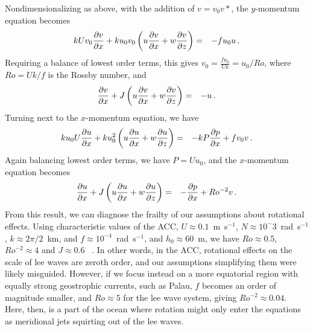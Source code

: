 \documentclass[12pt]{article}
\begin{document}
Nondimensionalizing as above, with the addition of $v = v_0 v*$, the $y$-momentum equation becomes
\begin{eqnarray*}
	kUv_0 \frac{\partial{v}}{\partial{x}} + ku_0v_0\left(u \frac{\partial{v}}{\partial{x}} + w \frac{\partial{v}}{\partial{z}}\right) &=& - fu_0u \,.\\
\end{eqnarray*}
Requiring a balance of lowest order terms, this gives $v_0 = \frac{fu_0}{Uk}=u_0/Ro$, where $Ro = Uk/f$ is the Rossby number, and
\begin{eqnarray*}
	 \frac{\partial{v}}{\partial{x}} + J\left(u \frac{\partial{v}}{\partial{x}} + w \frac{\partial{v}}{\partial{z}}\right) &=& - u \,.\\
\end{eqnarray*}
Turning next to the $x$-momentum equation, we have 
\begin{eqnarray*}
	k u_0 U \frac{\partial{u}}{\partial{x}} + k u_0^2\left( u\frac{\partial{u}}{\partial{x}} + w \frac{\partial{u}}{\partial{z}}\right)  &=& -k P \frac{\partial{p}}{\partial{x}} + fv_0v\,.
\end{eqnarray*}
Again balancing lowest order terms, we have $P=Uu_0$, and the $x$-momentum equation becomes
\begin{eqnarray*}
	\frac{\partial{u}}{\partial{x}} +J\left( u\frac{\partial{u}}{\partial{x}} + w \frac{\partial{u}}{\partial{z}}\right)  &=& -\frac{\partial{p}}{\partial{x}} + Ro^{-2}v\,.
\end{eqnarray*}	
From this result, we can diagnose the frailty of our assumptions about rotational effects. Using characteristic values of the ACC, $U \approx 0.1$~m~s$^{-1}$, $N \approx 10^-3$~rad~s$^{-1}$,  $k \approx 2\pi/2$~km, and $f\approx10^{-4}$~rad~s$^{-1}$, and $h_0\approx60$~m, we have $Ro \approx 0.5$, $Ro^{-2}\approx4$ and $J\approx 0.6$ ~\citep{Nikurashin2010a}. In other words, in the ACC, rotational effects on the scale of lee waves are zeroth order, and our assumptions simplifying them were likely misguided. However, if we focus instead on a more equatorial region with equally strong geostrophic currents, such as Palau, $f$ becomes an order of magnitude smaller, and $Ro\approx5$ for the lee wave system, giving $Ro^{-2}\approx 0.04$. Here, then, is a part of the ocean where rotation might only enter the equations as meridional jets squirting out of the lee waves.
	
	
	
	
	
\end{document}
